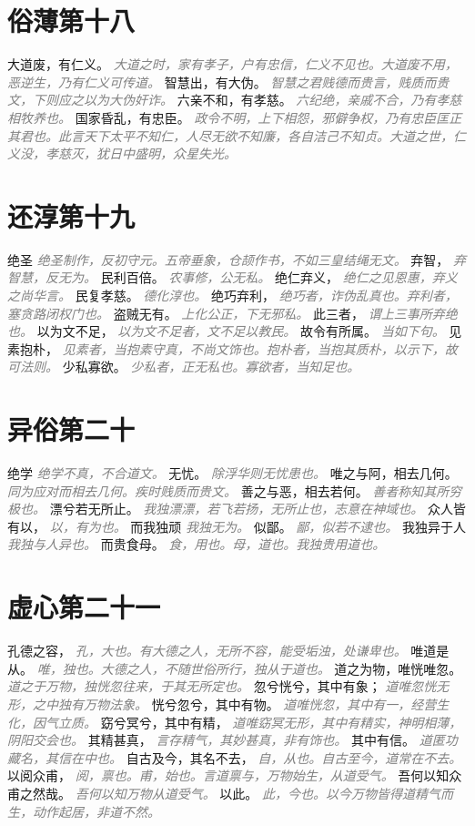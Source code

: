 \documentclass[a4paper,zihao=-4,oneside,landscape,UTF8]{ctexart}
\newcommand{\zhushi}[1]{\scriptsize{\textit{\textcolor{gray}{#1}}}\normalsize}
\begin{document}
\section{俗薄第十八}

大道废，有仁义。
\zhushi{大道之时，家有孝子，户有忠信，仁义不见也。大道废不用，恶逆生，乃有仁义可传道。}
智慧出，有大伪。
\zhushi{智慧之君贱德而贵言，贱质而贵文，下则应之以为大伪奸诈。}
六亲不和，有孝慈。
\zhushi{六纪绝，亲戚不合，乃有孝慈相牧养也。}
国家昏乱，有忠臣。
\zhushi{政令不明，上下相怨，邪僻争权，乃有忠臣匡正其君也。此言天下太平不知仁，人尽无欲不知廉，各自洁己不知贞。大道之世，仁义没，孝慈灭，犹日中盛明，众星失光。}


\section{还淳第十九}

绝圣
\zhushi{绝圣制作，反初守元。五帝垂象，仓颉作书，不如三皇结绳无文。}
弃智，
\zhushi{弃智慧，反无为。}
民利百倍。
\zhushi{农事修，公无私。}
绝仁弃义，
\zhushi{绝仁之见恩惠，弃义之尚华言。}
民复孝慈。
\zhushi{德化淳也。}
绝巧弃利，
\zhushi{绝巧者，诈伪乱真也。弃利者，塞贪路闭权门也。}
盗贼无有。
\zhushi{上化公正，下无邪私。}
此三者，
\zhushi{谓上三事所弃绝也。}
以为文不足，
\zhushi{以为文不足者，文不足以教民。}
故令有所属。
\zhushi{当如下句。}
见素抱朴，
\zhushi{见素者，当抱素守真，不尚文饰也。抱朴者，当抱其质朴，以示下，故可法则。}
少私寡欲。
\zhushi{少私者，正无私也。寡欲者，当知足也。}


\section{异俗第二十}

绝学
\zhushi{绝学不真，不合道文。}
无忧。
\zhushi{除浮华则无忧患也。}
唯之与阿，相去几何。
\zhushi{同为应对而相去几何。疾时贱质而贵文。}
善之与恶，相去若何。
\zhushi{善者称知其所穷极也。}
漂兮若无所止。
\zhushi{我独漂漂，若飞若扬，无所止也，志意在神域也。}
众人皆有以，
\zhushi{以，有为也。}
而我独顽
\zhushi{我独无为。}
似鄙。
\zhushi{鄙，似若不逮也。}
我独异于人
\zhushi{我独与人异也。}
而贵食母。
\zhushi{食，用也。母，道也。我独贵用道也。}


\section{虚心第二十一}

孔德之容，
\zhushi{孔，大也。有大德之人，无所不容，能受垢浊，处谦卑也。}
唯道是从。
\zhushi{唯，独也。大德之人，不随世俗所行，独从于道也。}
道之为物，唯恍唯忽。
\zhushi{道之于万物，独恍忽往来，于其无所定也。}
忽兮恍兮，其中有象；
\zhushi{道唯忽恍无形，之中独有万物法象。}
恍兮忽兮，其中有物。
\zhushi{道唯恍忽，其中有一，经营生化，因气立质。}
窈兮冥兮，其中有精，
\zhushi{道唯窈冥无形，其中有精实，神明相薄，阴阳交会也。}
其精甚真，
\zhushi{言存精气，其妙甚真，非有饰也。}
其中有信。
\zhushi{道匿功藏名，其信在中也。}
自古及今，其名不去，
\zhushi{自，从也。自古至今，道常在不去。}
以阅众甫，
\zhushi{阅，禀也。甫，始也。言道禀与，万物始生，从道受气。}
吾何以知众甫之然哉。
\zhushi{吾何以知万物从道受气。}
以此。
\zhushi{此，今也。以今万物皆得道精气而生，动作起居，非道不然。}
\end{document}
